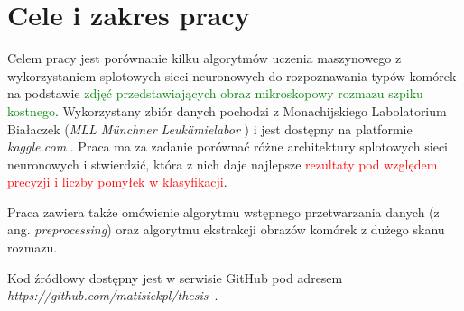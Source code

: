 \section{Cele i zakres pracy}

Celem pracy jest porównanie kilku algorytmów uczenia maszynowego z wykorzystaniem splotowych sieci neuronowych do rozpoznawania typów komórek na podstawie \textcolor{green}{zdjęć przedstawiających obraz mikroskopowy rozmazu szpiku kostnego}.
Wykorzystany zbiór danych pochodzi z
Monachijskiego Labolatorium Białaczek (\textit{MLL Münchner Leukämielabor} \cite{mll}) i jest dostępny na platformie \textit{kaggle.com} \cite{dataset}.
Praca ma za zadanie porównać różne architektury splotowych sieci neuronowych i stwierdzić, która z nich daje najlepsze \textcolor{red}{rezultaty pod względem precyzji i liczby pomyłek w klasyfikacji}.

Praca zawiera także omówienie algorytmu wstępnego przetwarzania danych (z ang. \textit{preprocessing}) oraz algorytmu ekstrakcji obrazów komórek z dużego skanu rozmazu.

Kod źródłowy dostępny jest w serwisie GitHub pod adresem \textit{https://github.com/matisiekpl/thesis}~\cite{code}.
